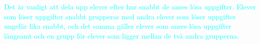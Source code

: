 \textcolor{cyan} {Det är vanligt att dela upp elever efter hur snabbt de anses lösa uppgifter. Elever som löser uppgifter snabbt grupperas med andra elever som löser uppgifter ungefär lika snabbt, och det samma gäller elever som anses lösa uppgifter långsamt och en grupp för elever som ligger mellan de två andra grupperna. \cite{Skolverket03}}